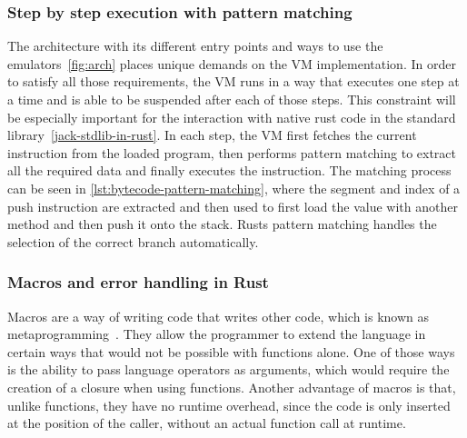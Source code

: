 \subsubsection{Step by step execution with pattern matching} \label{step-by-step}
The architecture with its different entry points and ways to use the emulators~\ref{fig:arch} places unique demands on the VM implementation.
In order to satisfy all those requirements, the VM runs in a way that executes one step at a time and is able to be suspended after each of those steps.
This constraint will be especially important for the interaction with native rust code in the standard library~\ref{jack-stdlib-in-rust}.
In each step, the VM first fetches the current instruction from the loaded program, then performs pattern matching to extract all the required data and finally executes the instruction.
The matching process can be seen in \cref{lst:bytecode-pattern-matching}, where the segment and index of a push instruction are extracted and then used to first load the value with another method and then push it onto the stack.
Rusts pattern matching handles the selection of the correct branch automatically.

\subsubsection{Macros and error handling in Rust} \label{macros-and-error-handling}
Macros are a way of writing code that writes other code, which is known as metaprogramming~\cite[Chapter~19.5]{klabnik2019rust}.
They allow the programmer to extend the language in certain ways that would not be possible with functions alone.
One of those ways is the ability to pass language operators as arguments, which would require the creation of a closure when using functions.
Another advantage of macros is that, unlike functions, they have no runtime overhead, since the code is only inserted at the position of the caller, without an actual function call at runtime.

